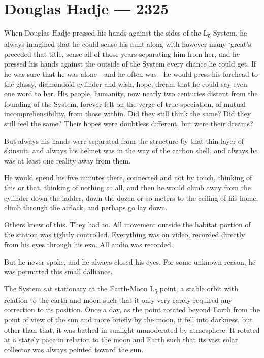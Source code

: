 \hypertarget{douglas-hadje-2325}{%
\chapter{Douglas Hadje — 2325}\label{douglas-hadje-2325}}

When Douglas Hadje pressed his hands against the sides of the L\textsubscript{5} System, he always imagined that he could sense his aunt along with however many `great's preceded that title, sense all of those years separating him from her, and he pressed his hands against the outside of the System every chance he could get. If he was sure that he was alone---and he often was---he would press his forehead to the glassy, diamondoid cylinder and wish, hope, dream that he could say even one word to her. His people, humanity, now nearly two centuries distant from the founding of the System, forever felt on the verge of true speciation, of mutual incomprehensibility, from those within. Did they still think the same? Did they still feel the same? Their hopes were doubtless different, but were their dreams?

But always his hands were separated from the structure by that thin layer of skinsuit, and always his helmet was in the way of the carbon shell, and always he was at least one reality away from them.

He would spend his five minutes there, connected and not by touch, thinking of this or that, thinking of nothing at all, and then he would climb away from the cylinder down the ladder, down the dozen or so meters to the ceiling of his home, climb through the airlock, and perhaps go lay down.

Others knew of this. They had to. All movement outside the habitat portion of the station was tightly controlled. Everything was on video, recorded directly from his eyes through his exo. All audio was recorded.

But he never spoke, and he always closed his eyes. For some unknown reason, he was permitted this small dalliance.

The System sat stationary at the Earth-Moon L\textsubscript{5} point, a stable orbit with relation to the earth and moon such that it only very rarely required any correction to its position. Once a day, as the point rotated beyond Earth from the point of view of the sun and more briefly by the moon, it fell into darkness, but other than that, it was bathed in sunlight unmoderated by atmosphere. It rotated at a stately pace in relation to the moon and Earth such that its vast solar collector was always pointed toward the sun.

